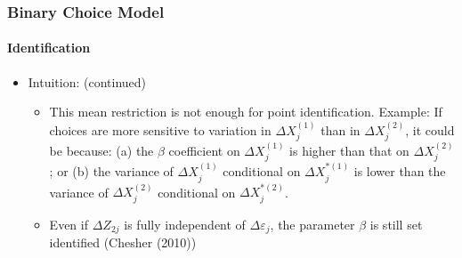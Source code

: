 \begin{frame}
\frametitle{Binary Choice Model}
\framesubtitle{Identification}

\begin{itemize}
	\item Intuition: (continued)
	\begin{itemize}
		\item This mean restriction is not enough for point identification. Example: If choices are more sensitive to variation in $\Delta X^{(1)}_{j}$ than in $\Delta X^{(2)}_{j}$, it could be because: (a) the $\beta$ coefficient on $\Delta X^{(1)}_{j}$ is higher than that on $\Delta X^{(2)}_{j}$; or (b) the variance of $\Delta X^{(1)}_{j}$ conditional on $\Delta X^{*(1)}_{j}$ is lower than the variance of $\Delta X^{(2)}_{j}$ conditional on $\Delta X^{*(2)}_{j}$.
		\item Even if $\Delta Z_{2j}$ is fully independent of $\Delta\varepsilon_{j}$, the parameter $\beta$ is still set identified (Chesher (2010))
	\end{itemize}
\end{itemize}
\end{frame}


